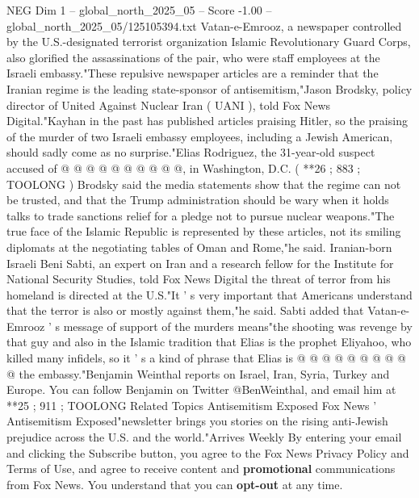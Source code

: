 \begin{textsample}{NEG Dim 1 – global\_north\_2025\_05 – Score -1.00 – global\_north\_2025\_05/125105394.txt}
Vatan-e-Emrooz, a newspaper controlled by the U.S.-designated terrorist organization Islamic Revolutionary Guard Corps, also glorified the assassinations of the pair, who were staff employees at the Israeli embassy."These repulsive newspaper articles are a reminder that the Iranian regime is the leading state-sponsor of antisemitism,"Jason Brodsky, policy director of United Against Nuclear Iran ( UANI ), told Fox News Digital."Kayhan in the past has published articles praising Hitler, so the praising of the murder of two Israeli embassy employees, including a Jewish American, should sadly come as no surprise."Elias Rodriguez, the 31-year-old suspect accused of @ @ @ @ @ @ @ @ @ @, in Washington, D.C. ( **26 ; 883 ; TOOLONG ) Brodsky said the media statements show that the regime can not be trusted, and that the Trump administration should be wary when it holds talks to trade sanctions relief for a pledge not to pursue nuclear weapons."The true face of the Islamic Republic is represented by these articles, not its smiling diplomats at the negotiating tables of Oman and Rome,"he said.
Iranian-born Israeli Beni Sabti, an expert on Iran and a research fellow for the Institute for National Security Studies, told Fox News Digital the threat of terror from his homeland is directed at the U.S."It ' s very important that Americans understand that the terror is also or mostly against them,"he said.
Sabti added that Vatan-e-Emrooz ' s message of support of the murders means"the shooting was revenge by that guy and also in the Islamic tradition that Elias is the prophet Eliyahoo, who killed many infidels, so it ' s a kind of phrase that Elias is @ @ @ @ @ @ @ @ @ @ the embassy."Benjamin Weinthal reports on Israel, Iran, Syria, Turkey and Europe.
You can follow Benjamin on Twitter @BenWeinthal, and email him at **25 ; 911 ; TOOLONG Related Topics Antisemitism Exposed Fox News ' Antisemitism Exposed"newsletter brings you stories on the rising anti-Jewish prejudice across the U.S. and the world."Arrives Weekly By entering your email and clicking the Subscribe button, you agree to the Fox News Privacy Policy and Terms of Use, and agree to receive content and \textbf{promotional} communications from Fox News.
You understand that you can \textbf{opt-out} at any time.

\end{textsample}
